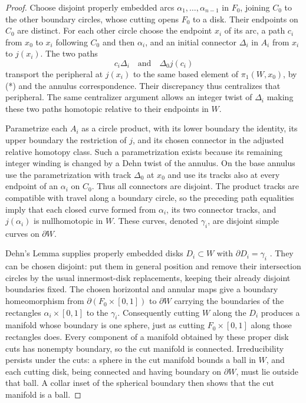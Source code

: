 \begin{proof}
Choose disjoint properly embedded arcs $\alpha_1,\ldots,\alpha_{n-1}$
in $F_0$, joining $C_0$ to the other boundary circles, whose cutting
opens $F_0$ to a disk.  Their endpoints on $C_0$ are distinct.
For each other circle choose the endpoint $x_i$ of its arc, a path
$c_i$ from $x_0$ to $x_i$ following $C_0$ and then $\alpha_i$, and an
initial connector $\Delta_i$ in $A_i$ from $x_i$ to $j(x_i)$.
The two paths
\[
 c_i\Delta_i\quad\text{and}\quad\Delta_0j(c_i)
\]
transport the peripheral at $j(x_i)$ to the same based element of
$\pi_1(W,x_0)$, by (*) and the annulus correspondence.
Their discrepancy thus centralizes that peripheral.  The same
centralizer argument allows an integer twist of $\Delta_i$ making
these two paths homotopic relative to their endpoints in $W$.

Parametrize each $A_i$ as a circle product, with its lower boundary
the identity, its upper boundary the restriction of $j$, and its
chosen connector in the adjusted relative homotopy class.  Such a
parametrization exists because its remaining integer winding is
changed by a Dehn twist of the annulus.  On the base annulus use the
parametrization with track $\Delta_0$ at $x_0$ and use its tracks also
at every endpoint of an $\alpha_i$ on $C_0$.  Thus all connectors are
disjoint.  The product tracks are compatible with travel along a
boundary circle, so the preceding path equalities imply that each
closed curve formed from $\alpha_i$, its two connector tracks, and
$j(\alpha_i)$ is nullhomotopic in $W$.  These curves, denoted $\gamma_i$,
are disjoint simple curves on $\partial W$.

Dehn's Lemma supplies properly embedded disks $D_i\subset W$ with
$\partial D_i=\gamma_i$ \cite{Papakyriakopoulos1957}.  They can be chosen
disjoint: put them in general position and remove their intersection
circles by the usual innermost-disk replacements, keeping their
already disjoint boundaries fixed.  The chosen horizontal and annular
maps give a boundary homeomorphism from $\partial(F_0\times[0,1])$
to $\partial W$ carrying the boundaries of the rectangles
$\alpha_i\times[0,1]$ to the $\gamma_i$.  Consequently cutting $W$
along the $D_i$ produces a manifold whose boundary is one sphere,
just as cutting $F_0\times[0,1]$ along those rectangles does.
Every component of a manifold obtained by these proper disk cuts has
nonempty boundary, so the cut manifold is connected.  Irreducibility
persists under the cuts: a sphere in the cut manifold bounds a ball
in $W$, and each cutting disk, being connected and having boundary
on $\partial W$, must lie outside that ball.  A collar inset of the
spherical boundary then shows that the cut manifold is a ball.


\end{proof}
